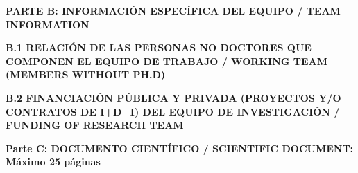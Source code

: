 \documentclass[a4paper,11pt,oneside]{article}
\begin{document}

\begin{tcolorbox}[colback=yellow,arc=0pt,outer arc=0pt,colframe=black,boxrule=0.6pt,left=0mm]
  \noindent\textbf{PARTE B: INFORMACIÓN ESPECÍFICA DEL EQUIPO / TEAM INFORMATION}
\end{tcolorbox}

\vspace{12pt}
\noindent\textbf{B.1 RELACIÓN DE LAS PERSONAS NO DOCTORES QUE COMPONEN EL EQUIPO DE TRABAJO / WORKING TEAM (MEMBERS WITHOUT PH.D) }




\noindent\textbf{B.2 FINANCIACIÓN PÚBLICA Y PRIVADA (PROYECTOS Y/O CONTRATOS DE I+D+I) DEL EQUIPO DE INVESTIGACIÓN / FUNDING OF RESEARCH TEAM}
\vspace{12pt}





\newpage
\setcounter{page}{1}



\begin{tcolorbox}[colback=yellow,arc=0pt,outer arc=0pt,colframe=black,boxrule=0.6pt,left=0mm]
  \noindent\textbf{Parte C: DOCUMENTO CIENTÍFICO / SCIENTIFIC DOCUMENT: Máximo 25 páginas}
\end{tcolorbox}
\end{document}
